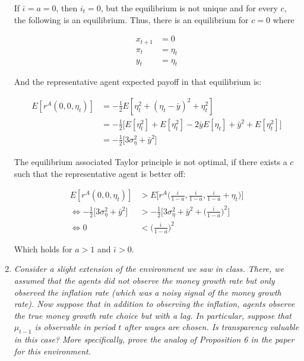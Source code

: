\documentclass{article}
\begin{document}
\begin{enumerate}
If $\bar \iota = a = 0$, then $i_t = 0$, but the equilibrium is not unique and for every $c$, the following is an equilibrium. Thus, there is an equilibrium for $c = 0$ where

\begin{align*}
x_{t+1} &= 0\\
\pi_t &= \eta_t\\
y_t &=\eta_t
\end{align*}

And the representative agent expected payoff in that equilibrium is:

\begin{align*}
E[r^A(0, 0,  \eta_t)]
&=
-\frac{1}{2} E[ \eta_t^2 + (\eta_t - \bar y)^2 + \eta_t^2]\\
&=
-\frac{1}{2} \Bigg[E[ \eta_t^2] + E[\eta_t^2] - 2\bar yE[\eta_t] + \bar y^2 + E[\eta_t^2]\Bigg]\\
&=
-\frac{1}{2} \Bigg[3 \sigma_\eta^2 + \bar y^2 \Bigg]
\end{align*}

The equilibrium associated Taylor principle is not optimal, if there exists a $c$ such that the representative agent is better off:

\begin{align*}
E[r^A(0, 0,  \eta_t)] &> E\Bigg[r^A\Bigg(\frac{\bar\iota}{1-a}, \frac{\bar\iota}{1-a}, \frac{\bar\iota}{1-a} + \eta_t\Bigg)\Bigg] \\
\iff
-\frac{1}{2} \Bigg[3 \sigma_\eta^2 + \bar y^2 \Bigg] &> -\frac{1}{2}\Bigg[ 3\sigma_\eta^2+ \bar y^2 + \Bigg(\frac{\bar\iota}{1-a}\Bigg)^2\Bigg]\\
\iff 0  &<  \Bigg(\frac{\bar\iota}{1-a}\Bigg)^2
\end{align*}

Which holds for $a > 1$ and $\bar\iota > 0$.

\pagebreak

\item \textit{Consider a slight extension of the environment we saw in class.
There, we assumed that the agents did not observe the money growth
rate but only observed the inflation rate (which was a noisy signal of
the money growth rate). Now suppose that in addition to observing the
inflation, agents observe the true money growth rate choice but with a
lag. In particular, suppose that $\mu_{t-1}$ is observable in period $t$ after wages
are chosen. Is transparency valuable in this case? More specifically, prove
the analog of Proposition 6 in the paper for this environment.}

\end{enumerate}
\end{document}
